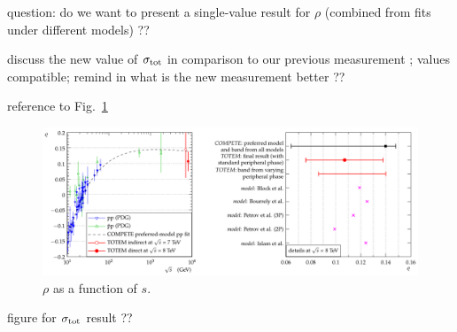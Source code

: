\> question: do we want to present a single-value result for $\rho$ (combined from fits under different models) ??

\> discuss the new value of $\sigma_{\rm tot}$ in comparison to our previous measurement \cite{prl111}; values compatible; remind in what is the new measurement better ??

\> reference to Fig.~\ref{fig:rho_s}

\begin{figure}
\begin{center}
\includegraphics[width=16cm]{fig/rho_s.pdf}
\vskip-3mm
\caption{$\rho$ as a function of $s$.}
\label{fig:rho_s}
\end{center}
\end{figure}

\> figure for $\sigma_{\rm tot}$ result ?? 
